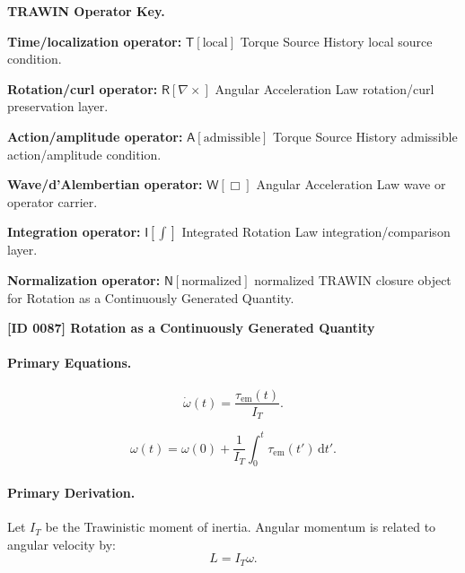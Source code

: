 \par\vspace{0.45\baselineskip}
\noindent\begin{minipage}[t]{\linewidth}
\begingroup
\small
\raggedright
\textbf{TRAWIN Operator Key.}\par
\noindent\textbf{Time/localization operator:} $\mathsf{T}\!\left[\mathrm{local}\right]$ Torque Source History local source condition.\par
\noindent\textbf{Rotation/curl operator:} $\mathsf{R}\!\left[\nabla\times\right]$ Angular Acceleration Law rotation/curl preservation layer.\par
\noindent\textbf{Action/amplitude operator:} $\mathsf{A}\!\left[\mathrm{admissible}\right]$ Torque Source History admissible action/amplitude condition.\par
\noindent\textbf{Wave/d'Alembertian operator:} $\mathsf{W}\!\left[\Box\right]$ Angular Acceleration Law wave or operator carrier.\par
\noindent\textbf{Integration operator:} $\mathsf{I}\!\left[\int\right]$ Integrated Rotation Law integration/comparison layer.\par
\noindent\textbf{Normalization operator:} $\mathsf{N}\!\left[\mathrm{normalized}\right]$ normalized TRAWIN closure object for Rotation as a Continuously Generated Quantity.\par
\endgroup
\end{minipage}

\clearpage
\noindent\textbf{[ID 0087] Rotation as a Continuously Generated Quantity}\par
\vspace{0.35em}
\paragraph{Primary Equations.}
\begin{equation}
\dot{\omega}(t)
=
\frac{\tau_{\mathrm{em}}(t)}{I_T}.
\end{equation}

\begin{equation}
\omega(t)
=
\omega(0)
+
\frac{1}{I_T}
\int_0^t
\tau_{\mathrm{em}}(t')
\,\mathrm{d}t' .
\end{equation}

\paragraph{Primary Derivation.}
Let $I_T$ be the Trawinistic moment of inertia.  
Angular momentum is related to angular velocity by:
\begin{equation}
L=I_T\omega .
\end{equation}

